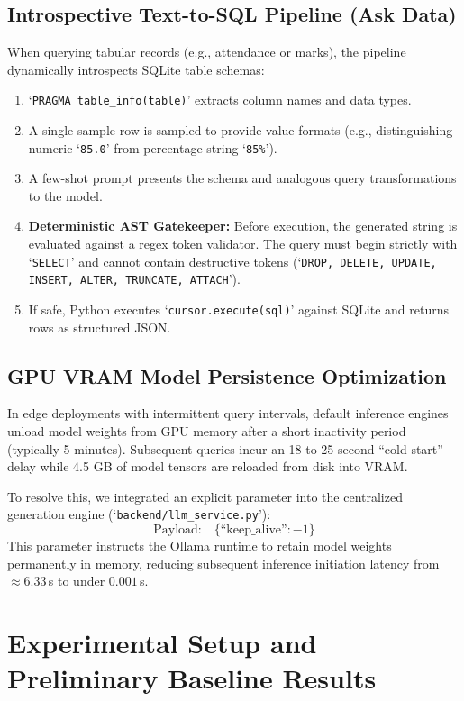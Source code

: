 \documentclass[conference]{IEEEtran}
\begin{document}
\subsection{Introspective Text-to-SQL Pipeline (Ask Data)}
When querying tabular records (e.g., attendance or marks), the pipeline dynamically introspects SQLite table schemas:
\begin{enumerate}
    \item `\texttt{PRAGMA table\_info(table)}' extracts column names and data types.
    \item A single sample row is sampled to provide value formats (e.g., distinguishing numeric `\texttt{85.0}' from percentage string `\texttt{85\%}').
    \item A few-shot prompt presents the schema and analogous query transformations to the model.
    \item \textbf{Deterministic AST Gatekeeper:} Before execution, the generated string is evaluated against a regex token validator. The query must begin strictly with `\texttt{SELECT}' and cannot contain destructive tokens (`\texttt{DROP, DELETE, UPDATE, INSERT, ALTER, TRUNCATE, ATTACH}').
    \item If safe, Python executes `\texttt{cursor.execute(sql)}' against SQLite and returns rows as structured JSON.
\end{enumerate}

\subsection{GPU VRAM Model Persistence Optimization}
In edge deployments with intermittent query intervals, default inference engines unload model weights from GPU memory after a short inactivity period (typically 5 minutes). Subsequent queries incur an 18 to 25-second ``cold-start'' delay while 4.5 GB of model tensors are reloaded from disk into VRAM. 

To resolve this, we integrated an explicit parameter into the centralized generation engine (`\texttt{backend/llm_service.py}'):
\begin{equation}
\text{Payload:} \quad \{ \text{``keep\_alive''}: -1 \}
\end{equation}
This parameter instructs the Ollama runtime to retain model weights permanently in memory, reducing subsequent inference initiation latency from $\approx 6.33$\,s to under $0.001$\,s.

\section{Experimental Setup and Preliminary Baseline Results}
\end{document}

